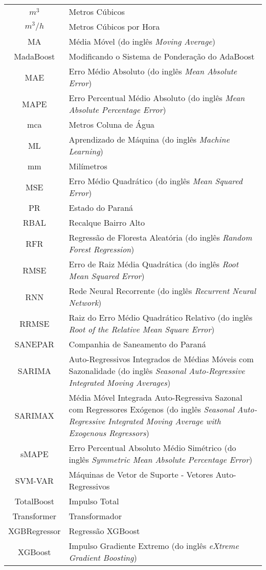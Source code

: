 \begin{tabular}{cp{}}
	$m^3$ & Metros Cúbicos\\
	$m^3/h$ & Metros Cúbicos por Hora\\
	MA & Média Móvel (do inglês \textit{Moving Average})\\
	MadaBoost & Modificando o Sistema de Ponderação do AdaBoost\\
	MAE & Erro Médio Absoluto (do inglês \textit{Mean Absolute Error})\\
	MAPE & Erro Percentual Médio Absoluto (do inglês \textit{Mean Absolute Percentage Error})\\
	mca & Metros Coluna de Água\\
	ML & Aprendizado de Máquina (do inglês \textit{Machine Learning})\\
	mm & Milímetros\\
	MSE & Erro Médio Quadrático (do inglês \textit{Mean Squared Error})\\
	PR & Estado do Paraná\\
	RBAL & Recalque Bairro Alto\\
	RFR & Regressão de Floresta Aleatória (do inglês \textit{Random Forest Regression})\\
	RMSE & Erro de Raiz Média Quadrática (do inglês \textit{Root Mean Squared Error})\\
	RNN & Rede Neural Recorrente (do inglês \textit{Recurrent Neural Network})\\
	RRMSE & Raiz do Erro Médio Quadrático Relativo (do inglês \textit{Root of the Relative Mean Square Error})\\
	SANEPAR & Companhia de Saneamento do Paraná \\
	SARIMA & Auto-Regressivos Integrados de Médias Móveis com Sazonalidade (do inglês \textit{Seasonal Auto-Regressive Integrated Moving Averages}) \\
	SARIMAX & Média Móvel Integrada Auto-Regressiva Sazonal com Regressores Exógenos (do inglês \textit{Seasonal Auto-Regressive Integrated Moving Average with Exogenous Regressors}) \\
	sMAPE &  Erro Percentual Absoluto Médio Simétrico (do inglês \textit{Symmetric Mean Absolute Percentage Error})\\
	SVM-VAR & Máquinas de Vetor de Suporte - Vetores Auto-Regressivos\\
	TotalBoost & Impulso Total\\
	Transformer & Transformador \\
	XGBRegressor & Regressão XGBoost\\
	XGBoost & Impulso Gradiente Extremo (do inglês \textit{eXtreme Gradient Boosting})
\end{tabular}
